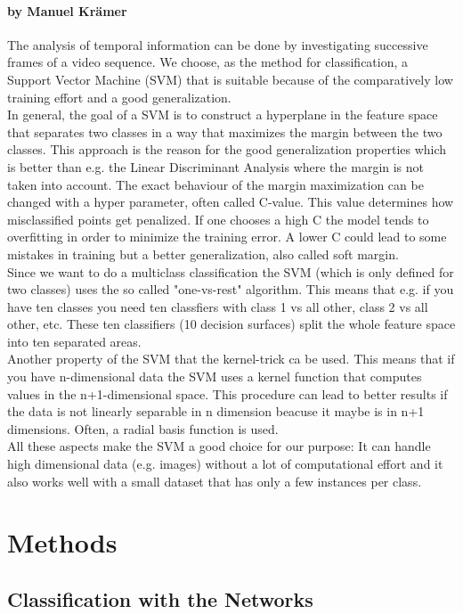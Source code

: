 \documentclass[11pt]{report}
\begin{document}
\subsubsection{by Manuel Krämer}
The analysis of temporal information can be done by investigating successive frames of a video sequence. We choose, as the method for classification, a Support Vector Machine (SVM) that is suitable because of the comparatively low training effort and a good generalization. \\
In general, the goal of a SVM is to construct a hyperplane in the feature space that separates two classes in a way that maximizes the margin between the two classes. This approach is the reason for the good generalization properties which is better than e.g. the Linear Discriminant Analysis where the margin is not taken into account. The exact behaviour of the margin maximization can be changed with a hyper parameter, often called C-value. This value determines how misclassified points get penalized. If one chooses a high C the model tends to overfitting in order to minimize the training error. A lower C could lead to some mistakes in training but a better generalization, also called soft margin. \\
Since we want to do a multiclass classification the SVM (which is only defined for two classes) uses the so called "one-vs-rest" algorithm. This means that e.g. if you have ten classes you need ten classfiers with class 1 vs all other, class 2 vs all other, etc. These ten classifiers (10 decision surfaces) split the whole feature space into ten separated areas.\\
Another property of the SVM that the kernel-trick ca be used. This means that if you have n-dimensional data the SVM uses a kernel function that computes values in the n+1-dimensional space. This procedure can lead to better results if the data is not linearly separable in n dimension beacuse it maybe is in n+1 dimensions. Often, a radial basis function is used.\\ 
All these aspects make the SVM a good choice for our purpose: It can handle high dimensional data (e.g. images) without a lot of computational effort and it also works well with a small dataset that has only a few instances per class.

\chapter{Methods}
\section{Classification with the Networks}
\end{document}
